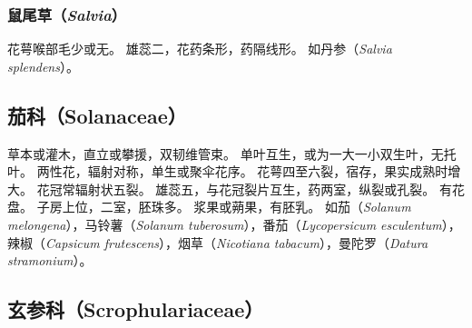 \documentclass[11pt]{article}
\begin{document}
\begin{sloppypar}
\subsubsection{鼠尾草（\textit{Salvia}）}
花萼喉部毛少或无。
雄蕊二，花药条形，药隔线形。
如丹参（\textit{Salvia splendens}）。

\subsection{茄科（Solanaceae）}
草本或灌木，直立或攀援，双韧维管束。
单叶互生，或为一大一小双生叶，无托叶。
两性花，辐射对称，单生或聚伞花序。
花萼四至六裂，宿存，果实成熟时增大。
花冠常辐射状五裂。
雄蕊五，与花冠裂片互生，药两室，纵裂或孔裂。
有花盘。
子房上位，二室，胚珠多。
浆果或蒴果，有胚乳。
如茄（\textit{Solanum melongena}），马铃薯（\textit{Solanum tuberosum}），番茄（\textit{Lycopersicum esculentum}），辣椒（\textit{Capsicum frutescens}），烟草（\textit{Nicotiana tabacum}），曼陀罗（\textit{Datura stramonium}）。

\subsection{玄参科（Scrophulariaceae）}

\end{sloppypar}
\end{document}
